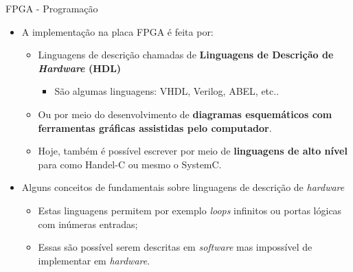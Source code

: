 	\begin{frame}{FPGA - Programação}
		\begin{itemize}
			\setlength\itemsep{1.0em}
			\item A implementação na placa FPGA é feita por:
			\begin{itemize}
				\setlength\itemsep{0.5em}
				\item Linguagens de descrição chamadas de \textbf{Linguagens de Descrição de \textit{Hardware} (HDL)}
				\begin{itemize}
					\item São algumas linguagens: VHDL, Verilog, ABEL, etc..
				\end{itemize}

				\item Ou por meio do desenvolvimento de \textbf{diagramas esquemáticos com ferramentas gráficas assistidas pelo computador}.

				\item Hoje, também é possível escrever por meio de \textbf{linguagens de alto nível} para como Handel-C ou mesmo o SystemC.
			\end{itemize}

			\item Alguns conceitos de fundamentais sobre linguagens de descrição de \textit{hardware}
			\begin{itemize}
				\setlength\itemsep{0.5em}
				\item Estas linguagens permitem por exemplo \textit{loops} infinitos ou portas lógicas com inúmeras entradas;

				\item Essas são possível serem descritas em \textit{software} mas impossível de implementar em \textit{hardware}.
			\end{itemize}
		\end{itemize}
	\end{frame}




